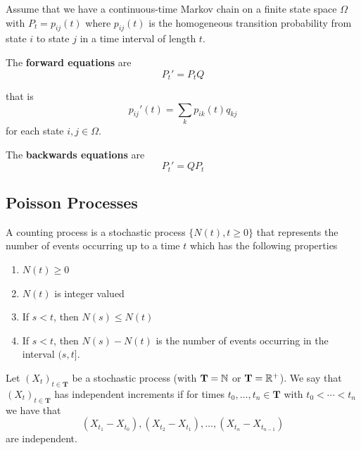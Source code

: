 \begin{theorem} \cite{grimmett2001}
Assume that we have a continuous-time Markov chain on a finite state space $\Omega$ with $P_t = p_{ij}(t)$ where $p_{ij}(t)$ is the homogeneous transition probability from state $i$ to state $j$ in a time interval of length $t$.

The \textbf{forward equations} are
\begin{equation}
    \label{eq:forward_eqs}
    P_t' = P_t Q
\end{equation}

that is
$$
p_{ij}'(t) = \sum_{k} p_{ik}(t) q_{kj}
$$
for each state $i,j \in \Omega$.

The \textbf{backwards equations} are
\begin{equation}
    \label{eq:backwards_eqs}
    P_t' = Q P_t
\end{equation}
\end{theorem}

\subsection{Poisson Processes}

\begin{defn} \cite{Ross_SP_95}
A counting process is a stochastic process $\{N(t), t \geq 0\}$ that represents the number of events occurring up to a time $t$ which has the following properties
\begin{enumerate}
    \item $N(t) \geq 0$
    \item $N(t)$ is integer valued
    \item If $s < t$, then $N(s) \leq N(t)$
    \item If $s < t$, then $N(s) - N(t)$ is the number of events occurring in the interval $(s, t]$.
\end{enumerate}
\end{defn}

\begin{defn}
Let $(X_t)_{t \in \mathbf T}$ be a stochastic process (with $\mathbf T = \mathbb{N}$ or $\mathbf T = \mathbb{R}^+$).
We say that $(X_t)_{t \in \mathbf T}$ has independent increments if for times $t_0, \ldots, t_n \in \mathbf T$ with $t_0 < \cdots < t_n$ we have that
$$
(X_{t_1} - X_{t_0}), (X_{t_2} - X_{t_1}), \ldots, (X_{t_n} - X_{t_{n - 1}})
$$
are independent.
\end{defn}

